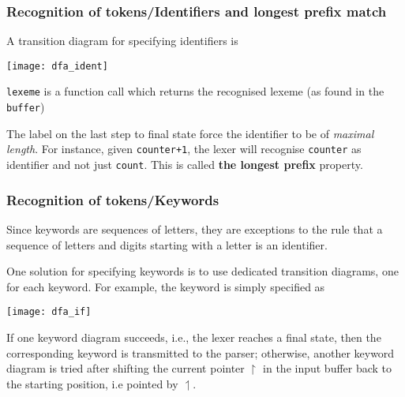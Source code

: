 % 
\begin{frame}
\frametitle{Recognition of tokens/Identifiers and longest prefix match}

\label{dfa_ident}

A transition diagram for specifying identifiers is
\begin{center}
\texttt{[image: dfa\_ident]}
\end{center}
\texttt{lexeme} is a function call which returns the recognised
lexeme (as found in the \texttt{buffer})

\bigskip

The \other label on the last step to final state force the identifier
to be of \emph{maximal length}. For instance,
given \texttt{counter+1}, the lexer will recognise \texttt{counter} as
identifier and not just \texttt{count}. This is called
\textbf{the longest prefix} property.

\end{frame}

% 
\begin{frame}
\frametitle{Recognition of tokens/Keywords}

Since keywords are sequences of letters, they are exceptions to the
rule that a sequence of letters and digits starting with a letter is
an identifier.

\bigskip

One solution for specifying keywords is to use dedicated transition
diagrams, one for each keyword. For example, the  keyword is
simply specified as
\begin{center}
\texttt{[image: dfa\_if]}
\end{center}
If one keyword diagram succeeds, i.e., the lexer reaches a final state,
then the corresponding keyword is transmitted to the parser;
otherwise, another keyword diagram is tried after shifting the current
pointer \(\upharpoonright\) in the input buffer back to the starting
position, i.e pointed by \(\upharpoonleft\).

\end{frame}

